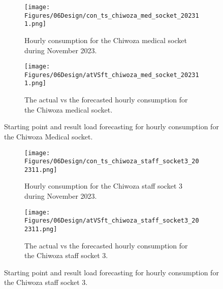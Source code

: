 \begin{figure}
    \begin{subfigure}{\textwidth}
    \centering
    \texttt{[image: Figures/06Design/con\_ts\_chiwoza\_med\_socket\_202311.png]}
    \caption{Hourly consumption for the Chiwoza medical socket during November 2023.}
    \label{fig:con_ts_chiwoza_med_socket_202311}
  \end{subfigure}

  \vspace{0.5cm}

  \begin{subfigure}{\textwidth}
    \centering
    \texttt{[image: Figures/06Design/atVSft\_chiwoza\_med\_socket\_202311.png]}
    \caption{The actual vs the forecasted hourly consumption for the Chiwoza medical socket.}
    \label{fig:atVSft_chiwoza_med_socket_202311}
  \end{subfigure}

  \caption[Medical light socket forecasting]{Starting point and result load forecasting for hourly consumption for the Chiwoza Medical socket.}
  \label{fig:forecasting_results_chiwoza_medical_socket}
\end{figure}

\begin{figure}
    \begin{minipage}{0.9\textwidth} %
    \begin{subfigure}{\textwidth}
        \centering
        \texttt{[image: Figures/06Design/con\_ts\_chiwoza\_staff\_socket3\_202311.png]}
        \caption{Hourly consumption for the Chiwoza staff socket 3 during November 2023.}
        \label{fig:con_ts_chiwoza_staff_socket3_202311}
    \end{subfigure}
    \end{minipage}

  \vspace{0.5cm}

    \begin{minipage}{0.9\textwidth} %
    \begin{subfigure}{\textwidth}
        \centering
        \texttt{[image: Figures/06Design/atVSft\_chiwoza\_staff\_socket3\_202311.png]}
        \caption{The actual vs the forecasted hourly consumption for the Chiwoza staff socket 3.}
        \label{fig:atVSft_chiwoza_staff_socket3_202311}
    \end{subfigure}
    \end{minipage}


  \caption[Staff socket 3 consumption forecasting]{Starting point and result load forecasting for hourly consumption for the Chiwoza staff socket 3.}
  \label{fig:forecasting_results_chiwoza_staff_socket3}
\end{figure}

